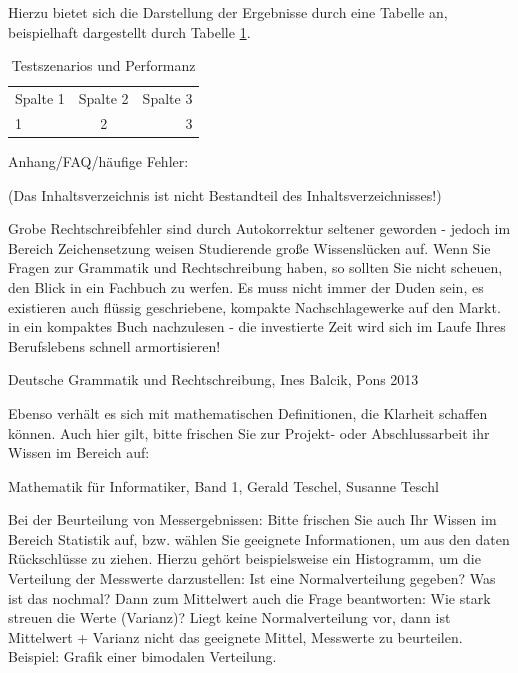 Hierzu bietet sich die Darstellung der Ergebnisse durch eine Tabelle an, beispielhaft dargestellt durch Tabelle \ref{tab:Ergebnis}.

\begin{table}[htb]

\begin{tabular}{lcr}
  Spalte 1 & Spalte 2 & Spalte 3 \\
  1 & 2 & 3 \\
 \end{tabular}
 \caption{Testszenarios und Performanz}
\label{tab:Ergebnis}
\end{table}

Anhang/FAQ/häufige Fehler:

(Das Inhaltsverzeichnis ist nicht Bestandteil des Inhaltsverzeichnisses!)

Grobe Rechtschreibfehler sind durch Autokorrektur seltener geworden - jedoch im Bereich Zeichensetzung weisen Studierende große Wissenslücken auf. 
Wenn Sie Fragen zur Grammatik und Rechtschreibung haben, so sollten Sie nicht scheuen, den Blick in ein Fachbuch zu werfen. Es muss nicht immer der Duden sein, es existieren auch flüssig geschriebene, kompakte Nachschlagewerke auf den Markt. in ein kompaktes Buch nachzulesen - die investierte Zeit wird sich im Laufe Ihres Berufslebens schnell armortisieren!

Deutsche Grammatik und Rechtschreibung, Ines Balcik, Pons 2013

Ebenso verhält es sich mit mathematischen Definitionen, die Klarheit schaffen können. Auch hier gilt, bitte frischen Sie zur Projekt- oder Abschlussarbeit ihr Wissen im Bereich auf:

Mathematik für Informatiker, Band 1, Gerald Teschel, Susanne Teschl

Bei der Beurteilung von Messergebnissen: Bitte frischen Sie auch Ihr Wissen im Bereich Statistik auf, bzw. wählen Sie geeignete Informationen, um aus den daten Rückschlüsse zu ziehen. Hierzu gehört beispielsweise ein Histogramm, um die Verteilung der Messwerte darzustellen: Ist eine Normalverteilung gegeben? Was ist das nochmal? Dann zum Mittelwert auch die Frage beantworten: Wie stark streuen die Werte (Varianz)? Liegt keine Normalverteilung vor, dann ist Mittelwert + Varianz nicht das geeignete Mittel, Messwerte zu beurteilen. Beispiel: Grafik einer bimodalen Verteilung.

